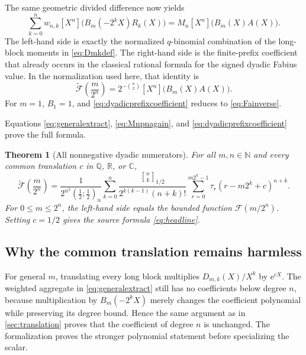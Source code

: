 \documentclass[11pt,oneside]{article}
\newtheorem{theorem}{Theorem}[section]
\theoremstyle{definition}
\theoremstyle{remark}
\newcommand{\qpoch}[3]{\left(#1;#2\right)_{#3}}
\newcommand{\halfqbinom}[2]{{\genfrac{[}{]}{0pt}{}{#1}{#2}}_{1/2}}
\newcommand{\F}{\mathcal F}
\newcommand{\G}{\widetilde{\mathcal F}}
\newcommand{\coeff}[2]{\left[#1^{#2}\right]}
\newcommand{\N}{\mathbb N}
\newcommand{\Q}{\mathbb Q}
\newcommand{\R}{\mathbb R}
\newcommand{\C}{\mathbb C}
\newcommand{\e}{\mathrm e}
\newcommand{\tm}{\tau}
\begin{document}
The same geometric divided difference now yields
\begin{equation}\label{eq:generalextract}
 \sum_{k=0}^{n}w_{n,k}
 \coeff{X}{n}\bigl(B_m(-2^kX)R_k(X)\bigr)
 =M_n\coeff{X}{n}\bigl(B_m(X)A(X)\bigr).
\end{equation}
The left-hand side is exactly the normalized $q$-binomial combination of
the long-block moments in \eqref{eq:Dmkdef}.  The right-hand side is the
finite-prefix coefficient that already occurs in the classical rational
formula for the signed dyadic Fabius value.  In the normalization used here,
that identity is
\begin{equation}\label{eq:dyadicprefixcoefficient}
 \boxed{
 \G\!\left(\frac{m}{2^n}\right)
 =2^{-\binom n2}\coeff{X}{n}\bigl(B_m(X)A(X)\bigr).}
\end{equation}
For $m=1$, $B_1=1$, and \eqref{eq:dyadicprefixcoefficient} reduces to
\eqref{eq:Fainverse}.

Equations \eqref{eq:generalextract}, \eqref{eq:Mnpnagain}, and
\eqref{eq:dyadicprefixcoefficient} prove the full formula.

\begin{theorem}[All nonnegative dyadic numerators]\label{thm:alldyadic}
For all $m,n\in\N$ and every common translation $c$ in $\Q$, $\R$, or
$\C$,
\begin{equation}\label{eq:alldyadic}
\boxed{
\G\!\left(\frac{m}{2^n}\right)
=
\frac{1}{2^{n^2}\qpoch{\frac12}{\frac12}{n}}
\sum_{k=0}^{n}
\frac{\halfqbinom{n}{k}}
     {2^{k(k-1)}(n+k)!}
\sum_{r=0}^{m2^k-1}
\tm_r(r-m2^k+c)^{n+k}.}
\end{equation}
For $0\le m\le2^n$, the left-hand side equals the bounded function
$\F(m/2^n)$.  Setting $c=1/2$ gives the source formula
\eqref{eq:headline}.
\end{theorem}

\subsection{Why the common translation remains harmless}

For general $m$, translating every long block multiplies
$D_{m,k}(X)/X^k$ by $\e^{cX}$.  The weighted aggregate in
\eqref{eq:generalextract} still has no coefficients below degree $n$,
because multiplication by $B_m(-2^kX)$ merely changes the coefficient
polynomial while preserving its degree bound.  Hence the same argument as in
\cref{sec:translation} proves that the coefficient of degree $n$ is
unchanged.  The formalization proves the stronger polynomial statement before
specializing the scalar.
\end{document}

